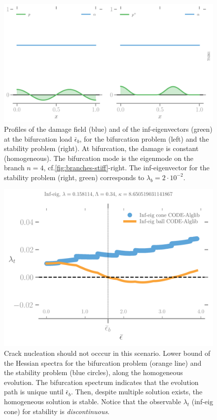 \documentclass[10pt]{article}
\begin{document}
\begin{figure}[htbp]
    \centering
    \includegraphics*[width=.95\textwidth]{../images/profiles-bif-stab-7f4361886184f3c6791fe16bf4f4b3f2.pdf}
    
    \caption{Profiles of the damage field (blue) and of the inf-eigenvectors (green)  at the bifurcation load $\bar \epsilon_b$, for the bifurcation problem (left) and the stability problem (right).
    At bifurcation, the damage is constant (homogeneous). 
    The bifurcation mode is the eigenmode on the branch $n=4$, cf.\ref{fig:branches-stiff}-right. 
    The inf-eigenvector for the stability problem (right, green) corresponds to $\lambda_b=2\cdot 10^{-2}$.}
      \label{fig:irreversibility-profiles}
\end{figure}

\begin{figure}[htbp]
    \centering
    \includegraphics*[width=.7\textwidth]{../images/irreversibility_inf_eig.png}
    \caption{Crack nucleation should not occcur in this scenario.
    Lower bound of the Hessian spectra for the bifurcation problem  (orange line) and the stability problem (blue circles), along the homogeneous evolution. The bifurcation spectrum indicates  that the evolution path is unique until $\bar \epsilon_b$. Then, despite multiple solution exists, the homogeneous solution is stable. Notice that the observable $\lambda_t$ (inf-eig cone) for stability is \emph{discontinuous}.
    }
    \label{fig:shouldnt}
\end{figure}
%
\end{document}
